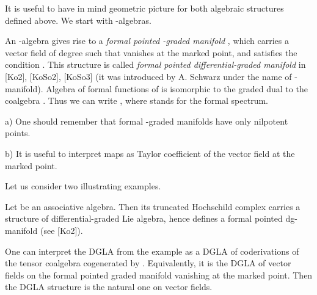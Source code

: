 \documentclass[a4paper,12pt]{article}
\begin{document}
It is useful to have in mind geometric picture for both algebraic
structures defined above. We start with  \coordHE{}-algebras.

 An \coordHE{}-algebra gives rise to a {\it formal pointed
\myHighlight{$\Z$}\coordHE{}-graded manifold \coordHE{}}, which carries a vector field \coordHE{}
of degree \coordHE{} such that \coordHE{} vanishes at the
marked point, and satisfies the condition \coordHE{}. This structure is
called {\it formal pointed differential-graded manifold} in [Ko2],
[KoSo2], [KoSo3] (it was introduced by
A. Schwarz under the name of \coordHE{}-manifold).  Algebra of formal functions
of \coordHE{} is isomorphic to the graded dual to the coalgebra \coordHE{}.
Thus we can write \coordHE{}, where \coordHE{} stands for the formal spectrum.

\begin{rmk} a) One should remember that formal \myHighlight{$\Z$}\coordHE{}-graded manifolds have only nilpotent
points.

b) It is useful to interpret maps \coordHE{} as Taylor coefficient of the vector field \coordHE{}
at the marked point.



\end{rmk}

Let us consider two illustrating examples.

\begin{exa} Let \coordHE{} be an associative algebra. Then its 
truncated Hochschild  complex 
\coordHE{}
carries a structure of differential-graded Lie algebra, hence
defines a formal pointed dg-manifold (see [Ko2]). 


\end{exa}

One can interpret the DGLA from the example as a DGLA of coderivations
of the tensor coalgebra cogenerated by \coordHE{}. Equivalently, it is
the DGLA of  vector fields  on the formal pointed graded manifold \coordHE{}
vanishing at the marked point.
Then the DGLA structure is the natural one on vector fields.
\end{document}
